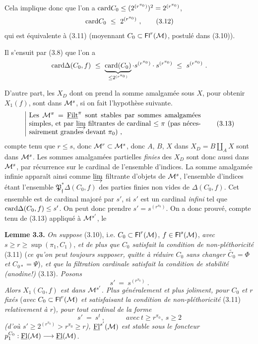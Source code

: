  Cela implique donc que l'on a $\mathrm{card} C_0\leq(2^{(r^{\pi_0})})^2=2^{(r^{\pi_0})}$,
\[
\card C_0\ \leq\ 2^{(r^{\pi_0})}\ , \tag*{(3.12)}
\]
qui est équivalente à (3.11) (moyennant $C_0\subset\mathsf{Fl}^r(\mathcal{M})$, postulé dans (3.10)).

Il s'ensuit par (3.8) que l'on a
\[
\card\Delta(C_0,f)\ \leq\ \underbrace{\card(C_0)}_{\leq 2^{(r^{\pi_0})}}\cdot s^{(r^{\pi_0})}\cdot s^{(r^{\pi_0})}\ \leq\ s^{(r^{\pi_0})}\ .
\]

D'autre part, les $X_D$ dont on prend la somme amalgamée sous $X$, pour obtenir $X_1(f)$, sont dans $\mathcal{M}^s$, si on fait l'hypothèse suivante. 
\[
\left|\ \parbox{0.72\linewidth}{Les $\M^\pi=\uFilt^\pi$ sont stables par sommes amalgamées simples, et par $\varinjlim$ filtrantes de cardinal $\leq\pi$ (pas nécessairement grandes devant $\pi_0$) ,}\right. \tag*{(3.13)}
\]
compte tenu que $r\leq s$, donc $\mathcal{M}^r\subset\mathcal{M}^s$, donc $A$, $B$, $X$ dans $X_D=B\amalg_A X$ sont dans $\mathcal{M}^s$. Les sommes amalgamées partielles \textit{finies} des $X_D$ sont donc aussi dans $\mathcal{M}^s$, par récurrence sur le cardinal de l'ensemble d'indices. La somme amalgamée infinie apparaît ainsi comme $\varinjlim$ filtrante d'objets de $\mathcal{M}^s$, l'ensemble d'indices étant l'ensemble $\mathfrak{P}^*_{\mathfrak{f}}\Delta(C_0,f)$ des parties finies non vides de $\Delta(C_0,f)$. Cet ensemble est de cardinal majoré par $s'$, si $s'$ est un cardinal \textit{infini} tel que $\mathrm{card}\Delta(C_0,f)\leq s'$. On peut donc prendre $s'=s^{(r^{\pi_0})}$. On a donc prouvé, compte tenu de (3.13) appliqué à $\mathcal{M}^{s'}$, le %

\textbf{Lemme 3.3.} \textit{On suppose} \textup{(3.10), i.e.} $C_0\subset\mathsf{Fl}^r(\mathcal{M})$, $f\in\mathsf{Fl}^s(\mathcal{M})$, \textit{avec} $s\geq r\geq\sup(\pi_1,C_1)$, \textit{et de plus que $C_0$ satisfait la condition de non-pléthoricité} \textup{(3.11)} \textup{(}\textit{ce qu'on peut toujours supposer, quitte à réduire $C_0$ sans changer $\widetilde{C_0}=\Phi$ et $C_{0*}=\Psi$}\textup{)}\textit{, et que la filtration cardinale satisfait la condition de stabilité (anodine!)} \textup{(3.13)}\textit{. Posons}
\[
s'\ =\ s^{(r^{\pi_0})}\ . \tag*{(3.14)}
\]
\textit{Alors $X_1(C_0,f)$ est dans $\mathcal{M}^{s'}$. Plus généralement et plus joliment, pour $C_0$ et $r$ fixés} \textup{(}\textit{avec $C_0\subset\mathsf{Fl}^r(\mathcal{M})$ et satisfaisant la condition de non-pléthoricité} \textup{(3.11)} \textit{relativement à $r$}\textup{)}\textit{, pour tout cardinal}  \textit{de la forme}
\[
s'\ =\ s^t\ ,\qquad\quad\textit{avec}\ t\geq r^{\pi_0},\ s\geq 2 \tag*{(3.15)}
\]
\textit{(d'où $s'\geq 2^{(r^{\pi_0})}>r^{\pi_0}\geq r$), $\underline{\mathrm{Fl}}^{s'}(\mathcal{M})$ est stable sous le foncteur $p_1^{C_0}:\underline{\mathrm{Fl}}(\mathcal{M})\longrightarrow\underline{\mathrm{Fl}}(\mathcal{M})$.}

